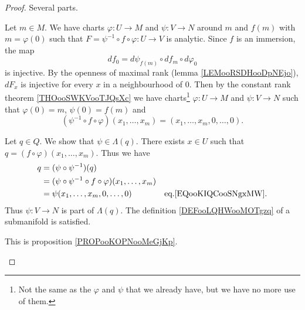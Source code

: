 \begin{proof}
	Several parts.
	\begin{subproof}
		\spitem[Submanifold]

		Let \( m\in M\). We have charts \(\varphi \colon U\to M  \) and \(\psi \colon V\to N  \) around \( m\) and \( f(m)\) with \( m=\varphi(0)\) such that \(F=\psi^{-1}\circ f\circ \varphi \colon U\to V  \) is analytic. Since \( f\) is an immersion, the map
		\begin{equation}
			df_0=d\psi_{f(m)}\circ df_m\circ d\varphi_0
		\end{equation}
		is injective. By the openness of maximal rank (lemma \ref{LEMooRSDHooDpNEjo}), \( dF_x\) is injective for every \( x\) in a neighbourhood of \( 0\). Then by the constant rank theorem \ref{THOooSWKVooTJQsXc} we have charts\footnote{Not the same as the \( \varphi\) and \( \psi\) that we already have, but we have no more use of them.} \(\varphi \colon U\to M  \) and \(\psi \colon V\to N  \) such that \( \varphi(0)=m\), \( \psi(0)=f(m)\) and
		\begin{equation}		\label{EQooKIQCooSNgxMW}
			(\psi^{-1}\circ f\circ\varphi)(x_1,\ldots,x_m)=(x_1,\ldots,x_m,0,\ldots,0).
		\end{equation}

		Let \( q\in Q\). We show that \( \psi\in\Lambda(q)\). There exists \( x\in U\) such that \( q=(f\circ \varphi)(x_1,\ldots,x_m)\). Thus we have
		\begin{subequations}
			\begin{align}
				q & =(\psi\circ\psi^{-1})(q)                                                                       \\
				  & =(\psi\circ\psi^{-1}\circ f\circ\varphi)(x_1,\ldots,x_m)                                       \\
				  & =\psi(x_1,\ldots,x_m,0,\ldots,0)                         & \text{eq.\eqref{EQooKIQCooSNgxMW}}.
			\end{align}
		\end{subequations}
		Thus \(\psi \colon V\to N  \) is part of \( \Lambda(q)\). The definition \ref{DEFooLQHWooMOTgzq} of a submanifold is satisfied.

		\spitem[\( f\) is analytic]
		This is proposition \ref{PROPooKOPNooMeGjKp}.


\end{subproof}
\end{proof}
